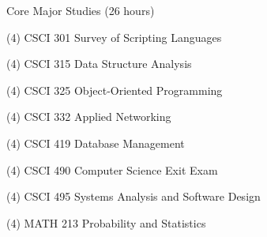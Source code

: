 \begin{reqgroup}{Core Major Studies (26 hours)}
\begin{checklist}
\begin{minipage}{0.5\linewidth}
	\item (4) CSCI 301	Survey of Scripting Languages
	\item (4) CSCI 315	Data Structure Analysis
	\item (4) CSCI 325	Object-Oriented Programming
	\item (4) CSCI 332	Applied Networking
\end{minipage}
\begin{minipage}{0.5\linewidth}
	\item (4) CSCI 419	Database Management
	\item (4) CSCI 490	Computer Science Exit Exam
	\item (4) CSCI 495	Systems Analysis and Software Design
	\item (4) MATH 213	Probability and Statistics
	\end{minipage}
\end{checklist}
\end{reqgroup}

